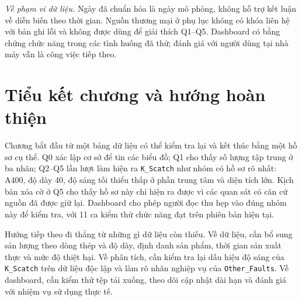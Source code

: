 \documentclass[12pt,a4paper,oneside]{report}
\newcommand{\maCot}[1]{{\urlstyle{tt}\def\UrlBreaks{\do\_\do\/\do\.}\def\UrlBigBreaks{}\nolinkurl{#1}}}
\begin{document}
\emph{Về phạm vi dữ liệu.} Ngày đã chuẩn hóa là ngày mô phỏng, không hỗ trợ kết luận về diễn biến theo thời gian. Nguồn thương mại ở phụ lục không có khóa liên hệ với bản ghi lỗi và không được dùng để giải thích Q1--Q5. Dashboard có bằng chứng chức năng trong các tình huống đã thử; đánh giá với người dùng tại nhà máy vẫn là công việc tiếp theo.

\section{Tiểu kết chương và hướng hoàn thiện}

Chương bắt đầu từ một bảng dữ liệu có thể kiểm tra lại và kết thúc bằng một hồ sơ cụ thể. Q0 xác lập cơ sở để tin các biểu đồ; Q1 cho thấy số lượng tập trung ở ba nhãn; Q2--Q5 lần lượt làm hiện ra \maCot{K_Scatch} như nhóm có hồ sơ rõ nhất: A400, độ dày 40, độ sáng tối thiểu thấp ở phần trung tâm và diện tích lớn. Kịch bản xóa cờ ở Q5 cho thấy hồ sơ này chỉ hiện ra được vì các quan sát có căn cứ nguồn đã được giữ lại. Dashboard cho phép người đọc thu hẹp vào đúng nhóm này để kiểm tra, với 11 ca kiểm thử chức năng đạt trên phiên bản hiện tại.

Hướng tiếp theo đi thẳng từ những gì dữ liệu còn thiếu. Về dữ liệu, cần bổ sung sản lượng theo dòng thép và độ dày, định danh sản phẩm, thời gian sản xuất thực và mức độ thiệt hại. Về phân tích, cần kiểm tra lại dấu hiệu độ sáng của \maCot{K_Scatch} trên dữ liệu độc lập và làm rõ nhãn nghiệp vụ của \maCot{Other_Faults}. Về dashboard, cần kiểm thử tệp tải xuống, theo dõi cập nhật dài hạn và đánh giá với nhiệm vụ sử dụng thực tế.
\end{document}
